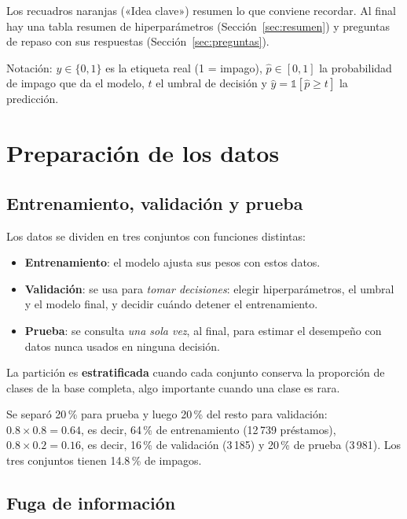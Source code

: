 \documentclass[11pt,a4paper]{article}
\begin{document}
Los recuadros naranjas («Idea clave») resumen lo que conviene recordar. Al final hay una tabla resumen de hiperparámetros (Sección~\ref{sec:resumen}) y preguntas de repaso con sus respuestas (Sección~\ref{sec:preguntas}).

Notación: $y\in\{0,1\}$ es la etiqueta real (1 = impago), $\hat p\in[0,1]$ la probabilidad de impago que da el modelo, $t$ el umbral de decisión y $\hat y = \mathbb{1}[\hat p \ge t]$ la predicción.

\section{Preparación de los datos}

\subsection{Entrenamiento, validación y prueba}

Los datos se dividen en tres conjuntos con funciones distintas:

\begin{itemize}
\item \textbf{Entrenamiento}: el modelo ajusta sus pesos con estos datos.
\item \textbf{Validación}: se usa para \emph{tomar decisiones}: elegir hiperparámetros, el umbral y el modelo final, y decidir cuándo detener el entrenamiento.
\item \textbf{Prueba}: se consulta \emph{una sola vez}, al final, para estimar el desempeño con datos nunca usados en ninguna decisión.
\end{itemize}

La partición es \textbf{estratificada} cuando cada conjunto conserva la proporción de clases de la base completa, algo importante cuando una clase es rara.

\begin{proyecto}
Se separó 20\,\% para prueba y luego 20\,\% del resto para validación: $0.8\times0.8=0.64$, es decir, 64\,\% de entrenamiento (12\,739 préstamos), $0.8\times0.2=0.16$, es decir, 16\,\% de validación (3\,185) y 20\,\% de prueba (3\,981). Los tres conjuntos tienen 14.8\,\% de impagos.
\end{proyecto}

\subsection{Fuga de información}
\end{document}
